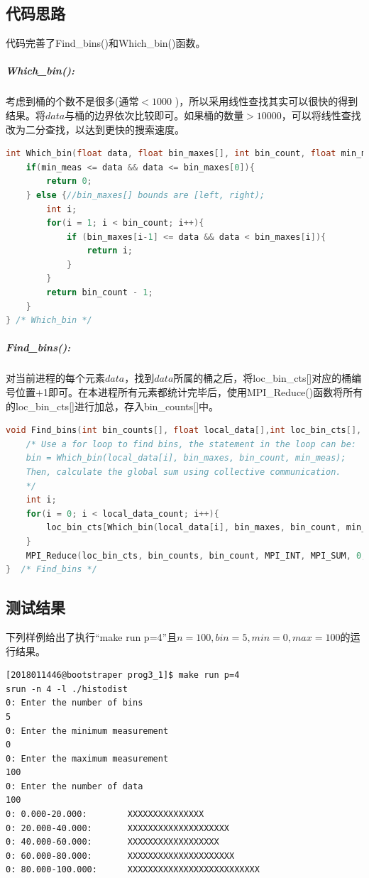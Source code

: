 \documentclass[UTF8, onecolumn, a4paper]{article}
\begin{document}
\subsection{代码思路}
代码完善了Find\_bins()和Which\_bin()函数。
\subparagraph*{Which\_bin():}考虑到桶的个数不是很多(通常$<1000$ )，所以采用线性查找其实可以很快的得到结果。将$data$与桶的边界依次比较即可。如果桶的数量$>10000$，可以将线性查找改为二分查找，以达到更快的搜索速度。
\begin{lstlisting}[language={c}, title={Which\_bin()}]
int Which_bin(float data, float bin_maxes[], int bin_count, float min_meas) {
	if(min_meas <= data && data <= bin_maxes[0]){
		return 0;
	} else {//bin_maxes[] bounds are [left, right);
		int i;
		for(i = 1; i < bin_count; i++){
			if (bin_maxes[i-1] <= data && data < bin_maxes[i]){
				return i;
			}
		}
		return bin_count - 1;
	}
} /* Which_bin */
\end{lstlisting}
\subparagraph*{Find\_bins():}
对当前进程的每个元素$data$，找到$data$所属的桶之后，将loc\_bin\_cts[]对应的桶编号位置+1即可。在本进程所有元素都统计完毕后，使用MPI\_Reduce()函数将所有的loc\_bin\_cts[]进行加总，存入bin\_counts[]中。
\begin{lstlisting}[language={c}, title={Find\_bins()}]
void Find_bins(int bin_counts[], float local_data[],int loc_bin_cts[], int local_data_count, float bin_maxes[], int bin_count, float min_meas, MPI_Comm comm){
	/* Use a for loop to find bins, the statement in the loop can be:
	bin = Which_bin(local_data[i], bin_maxes, bin_count, min_meas);
	Then, calculate the global sum using collective communication.
	*/
	int i;
	for(i = 0; i < local_data_count; i++){
		loc_bin_cts[Which_bin(local_data[i], bin_maxes, bin_count, min_meas)] ++;
	}
	MPI_Reduce(loc_bin_cts, bin_counts, bin_count, MPI_INT, MPI_SUM, 0, comm);
}  /* Find_bins */
\end{lstlisting}
\subsection{测试结果}
下列样例给出了执行“make run p=4”且$n=100, bin=5, min=0, max=100$的运行结果。
\begin{lstlisting}[language={}, title={$p=4, n=100, bin=5, min=0, max=100$}]
[2018011446@bootstraper prog3_1]$ make run p=4
srun -n 4 -l ./histodist
0: Enter the number of bins
5
0: Enter the minimum measurement
0
0: Enter the maximum measurement
100
0: Enter the number of data
100
0: 0.000-20.000:        XXXXXXXXXXXXXXX
0: 20.000-40.000:       XXXXXXXXXXXXXXXXXXXX
0: 40.000-60.000:       XXXXXXXXXXXXXXXXXX
0: 60.000-80.000:       XXXXXXXXXXXXXXXXXXXXX
0: 80.000-100.000:      XXXXXXXXXXXXXXXXXXXXXXXXXX
\end{lstlisting}
\end{document}
